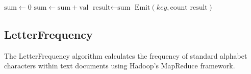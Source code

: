 \begin{algorithm}
\begin{algorithmic}[1]
    \Statex
    \State $\text{sum} \gets 0$
        \State $\text{sum} \gets \text{sum} + \text{val}$ 
    \EndFor
    \State $\text{result} \gets \text{sum}$
    \State $\text{Emit}(key, \text{count } \text{result})$ 
    \EndProcedure
\EndClass
\end{algorithmic}

\end{algorithm}




\subsection{LetterFrequency}
The LetterFrequency algorithm calculates the frequency of standard alphabet characters within text documents using Hadoop's MapReduce framework.














